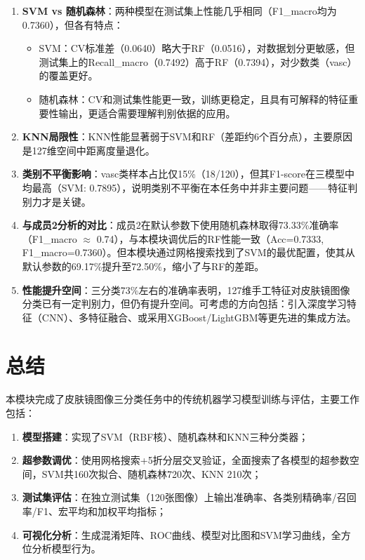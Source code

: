 \documentclass[12pt,a4paper]{ctexart}
\begin{document}
\begin{enumerate}[label=(\arabic*)]
    \item \textbf{SVM vs 随机森林}：两种模型在测试集上性能几乎相同（F1\_macro均为0.7360），但各有特点：
    \begin{itemize}
        \item SVM：CV标准差（0.0640）略大于RF（0.0516），对数据划分更敏感，但测试集上的Recall\_macro（0.7492）高于RF（0.7394），对少数类（vasc）的覆盖更好。
        \item 随机森林：CV和测试集性能更一致，训练更稳定，且具有可解释的特征重要性输出，更适合需要理解判别依据的应用。
    \end{itemize}
    \item \textbf{KNN局限性}：KNN性能显著弱于SVM和RF（差距约6个百分点），主要原因是127维空间中距离度量退化。
    \item \textbf{类别不平衡影响}：vasc类样本占比仅15\%（18/120），但其F1-score在三模型中均最高（SVM: 0.7895），说明类别不平衡在本任务中并非主要问题——特征判别力才是关键。
    \item \textbf{与成员2分析的对比}：成员2在默认参数下使用随机森林取得73.33\%准确率（F1\_macro $\approx$ 0.74），与本模块调优后的RF性能一致（Acc=0.7333, F1\_macro=0.7360）。但本模块通过网格搜索找到了SVM的最优配置，使其从默认参数的69.17\%提升至72.50\%，缩小了与RF的差距。
    \item \textbf{性能提升空间}：三分类73\%左右的准确率表明，127维手工特征对皮肤镜图像分类已有一定判别力，但仍有提升空间。可考虑的方向包括：引入深度学习特征（CNN）、多特征融合、或采用XGBoost/LightGBM等更先进的集成方法。
\end{enumerate}

\section{总结}

本模块完成了皮肤镜图像三分类任务中的传统机器学习模型训练与评估，主要工作包括：

\begin{enumerate}[label=(\arabic*)]
    \item \textbf{模型搭建}：实现了SVM（RBF核）、随机森林和KNN三种分类器；
    \item \textbf{超参数调优}：使用网格搜索+5折分层交叉验证，全面搜索了各模型的超参数空间，SVM共160次拟合、随机森林720次、KNN 210次；
    \item \textbf{测试集评估}：在独立测试集（120张图像）上输出准确率、各类别精确率/召回率/F1、宏平均和加权平均指标；
    \item \textbf{可视化分析}：生成混淆矩阵、ROC曲线、模型对比图和SVM学习曲线，全方位分析模型行为。
\end{enumerate}
\end{document}
